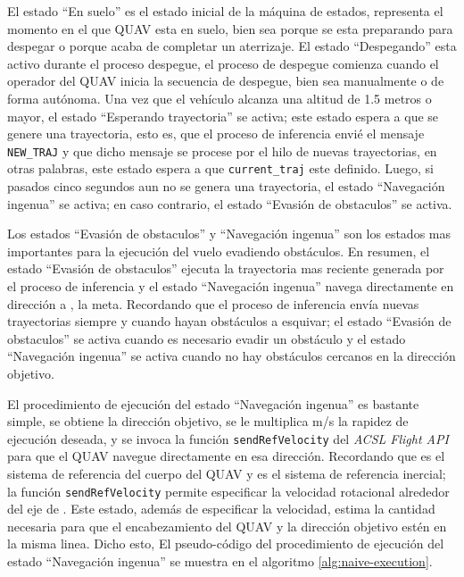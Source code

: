 El estado ``En suelo'' es el estado inicial de la máquina de estados, representa el momento en el que QUAV esta en suelo, bien sea porque se esta preparando para despegar o porque acaba de completar un aterrizaje. El estado ``Despegando'' esta activo durante el proceso despegue, el proceso de despegue comienza cuando el operador del QUAV inicia la secuencia de despegue, bien sea manualmente o de forma autónoma. Una vez que el vehículo alcanza una altitud de 1.5 metros o mayor, el estado ``Esperando trayectoria'' se activa; este estado espera a que se genere una trayectoria, esto es, que el proceso de inferencia envié el mensaje \texttt{NEW\_TRAJ} y que dicho mensaje se procese por el hilo de nuevas trayectorias, en otras palabras, este estado espera a que \texttt{current\_traj} este definido. Luego, si pasados cinco segundos aun no se genera una trayectoria, el estado ``Navegación ingenua'' se activa; en caso contrario, el estado ``Evasión de obstaculos'' se activa.

Los estados ``Evasión de obstaculos'' y ``Navegación ingenua'' son los estados mas importantes para la ejecución del vuelo evadiendo obstáculos. En resumen, el estado ``Evasión de obstaculos'' ejecuta la trayectoria mas reciente generada por el proceso de inferencia y el estado ``Navegación ingenua'' navega directamente en dirección a , la meta. Recordando que el proceso de inferencia envía nuevas trayectorias siempre y cuando hayan obstáculos a esquivar; el estado ``Evasión de obstaculos'' se activa cuando es necesario evadir un obstáculo y el estado ``Navegación ingenua'' se activa cuando no hay obstáculos cercanos en la dirección objetivo. 

El procedimiento de ejecución del estado ``Navegación ingenua'' es bastante simple, se obtiene la dirección objetivo, se le multiplica  m/s la rapidez de ejecución deseada, y se invoca la función \texttt{sendRefVelocity} del \textit{ACSL Flight API} para que el QUAV navegue directamente en esa dirección. Recordando que  es el sistema de referencia del cuerpo del QUAV y  es el sistema de referencia inercial; la función \texttt{sendRefVelocity} permite especificar  la velocidad rotacional alrededor del eje  de . Este estado, además de especificar la velocidad, estima la cantidad  necesaria para que el encabezamiento del QUAV y la dirección objetivo estén en la misma linea. Dicho esto, El pseudo-código del procedimiento de ejecución del estado ``Navegación ingenua'' se muestra en el algoritmo \ref{alg:naive-execution}.

